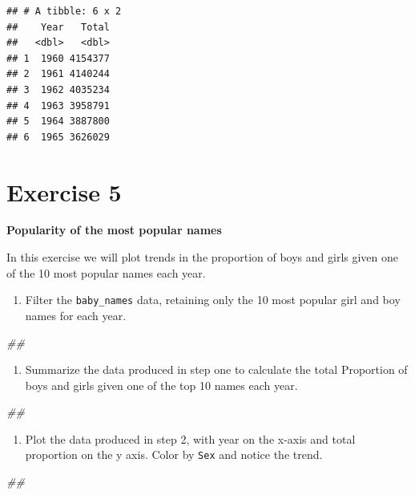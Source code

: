 \documentclass[]{book}
\newenvironment{Shaded}{\begin{snugshade}}{\end{snugshade}}
\newcommand{\CommentTok}[1]{\textcolor[rgb]{0.56,0.35,0.01}{\textit{#1}}}
\providecommand{\tightlist}{%
  \setlength{\itemsep}{0pt}\setlength{\parskip}{0pt}}
\begin{document}
\begin{verbatim}
## # A tibble: 6 x 2
##    Year   Total
##   <dbl>   <dbl>
## 1  1960 4154377
## 2  1961 4140244
## 3  1962 4035234
## 4  1963 3958791
## 5  1964 3887800
## 6  1965 3626029
\end{verbatim}

\hypertarget{exercise-5}{%
\section{Exercise 5}\label{exercise-5}}

\textbf{Popularity of the most popular names}

In this exercise we will plot trends in the proportion of boys and girls
given one of the 10 most popular names each year.

\begin{enumerate}
\def\labelenumi{\arabic{enumi}.}
\tightlist
\item
  Filter the \texttt{baby\_names} data, retaining only the 10 most popular girl
  and boy names for each year.
\end{enumerate}

\begin{Shaded}
\begin{Highlighting}[]
\CommentTok{##}
\end{Highlighting}
\end{Shaded}

\begin{enumerate}
\def\labelenumi{\arabic{enumi}.}
\setcounter{enumi}{1}
\tightlist
\item
  Summarize the data produced in step one to calculate the total
  Proportion of boys and girls given one of the top 10 names
  each year.
\end{enumerate}

\begin{Shaded}
\begin{Highlighting}[]
\CommentTok{##}
\end{Highlighting}
\end{Shaded}

\begin{enumerate}
\def\labelenumi{\arabic{enumi}.}
\setcounter{enumi}{2}
\tightlist
\item
  Plot the data produced in step 2, with year on the x-axis
  and total proportion on the y axis. Color by \texttt{Sex} and notice
  the trend.
\end{enumerate}

\begin{Shaded}
\begin{Highlighting}[]
\CommentTok{##}
\end{Highlighting}
\end{Shaded}
\end{document}
